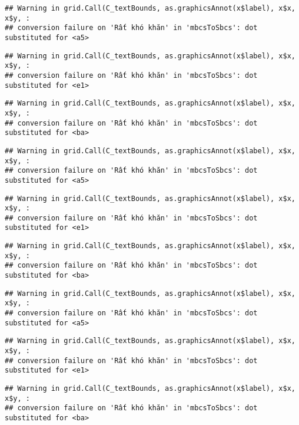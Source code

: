 \documentclass[
]{article}
\begin{document}
\begin{verbatim}
## Warning in grid.Call(C_textBounds, as.graphicsAnnot(x$label), x$x, x$y, :
## conversion failure on 'Rất khó khăn' in 'mbcsToSbcs': dot substituted for <a5>
\end{verbatim}

\begin{verbatim}
## Warning in grid.Call(C_textBounds, as.graphicsAnnot(x$label), x$x, x$y, :
## conversion failure on 'Rất khó khăn' in 'mbcsToSbcs': dot substituted for <e1>
\end{verbatim}

\begin{verbatim}
## Warning in grid.Call(C_textBounds, as.graphicsAnnot(x$label), x$x, x$y, :
## conversion failure on 'Rất khó khăn' in 'mbcsToSbcs': dot substituted for <ba>
\end{verbatim}

\begin{verbatim}
## Warning in grid.Call(C_textBounds, as.graphicsAnnot(x$label), x$x, x$y, :
## conversion failure on 'Rất khó khăn' in 'mbcsToSbcs': dot substituted for <a5>
\end{verbatim}

\begin{verbatim}
## Warning in grid.Call(C_textBounds, as.graphicsAnnot(x$label), x$x, x$y, :
## conversion failure on 'Rất khó khăn' in 'mbcsToSbcs': dot substituted for <e1>
\end{verbatim}

\begin{verbatim}
## Warning in grid.Call(C_textBounds, as.graphicsAnnot(x$label), x$x, x$y, :
## conversion failure on 'Rất khó khăn' in 'mbcsToSbcs': dot substituted for <ba>
\end{verbatim}

\begin{verbatim}
## Warning in grid.Call(C_textBounds, as.graphicsAnnot(x$label), x$x, x$y, :
## conversion failure on 'Rất khó khăn' in 'mbcsToSbcs': dot substituted for <a5>
\end{verbatim}

\begin{verbatim}
## Warning in grid.Call(C_textBounds, as.graphicsAnnot(x$label), x$x, x$y, :
## conversion failure on 'Rất khó khăn' in 'mbcsToSbcs': dot substituted for <e1>
\end{verbatim}

\begin{verbatim}
## Warning in grid.Call(C_textBounds, as.graphicsAnnot(x$label), x$x, x$y, :
## conversion failure on 'Rất khó khăn' in 'mbcsToSbcs': dot substituted for <ba>
\end{verbatim}
\end{document}

